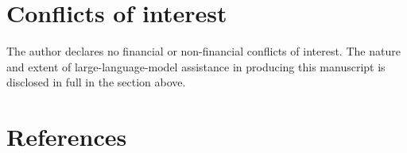 \documentclass[11pt, a4paper, abstract=yes]{scrartcl}
\theoremstyle{definition}
\theoremstyle{remark}
\theoremstyle{plain}
\begin{document}
\section*{Conflicts of interest}
\label{sec:org017c262}
The author declares no financial or non-financial conflicts of interest. The nature and extent of
large-language-model assistance in producing this manuscript is disclosed in full in the section
above.
\section*{References}
\label{sec:org5a3f7e6}
\printbibliography[heading=none]
\end{document}
